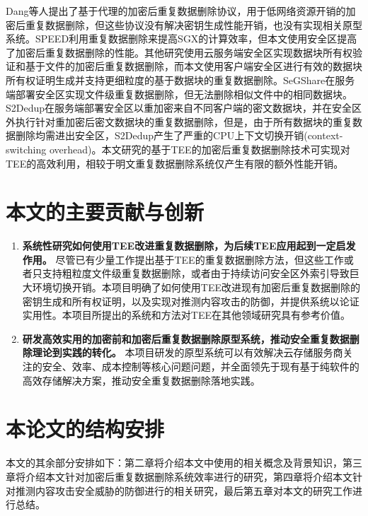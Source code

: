 Dang等人\cite{dang2017Privacy}提出了基于代理的加密后重复数据删除协议，用于低网络资源开销的加密后重复数据删除，但这些协议没有解决密钥生成性能开销，也没有实现相关原型系统。SPEED\cite{cui2019SPEED}利用重复数据删除来提高SGX的计算效率，但本文使用安全区提高了加密后重复数据删除的性能。其他研究使用云服务端安全区实现数据块所有权验证\cite{you2020Proofs}和基于文件的加密后重复数据删除\cite{fuhry20}，而本文使用客户端安全区进行有效的数据块所有权证明生成并支持更细粒度的基于数据块的重复数据删除。SeGShare\cite{fuhry2020segshare}在服务端部署安全区实现文件级重复数据删除，但无法删除相似文件中的相同数据块。S2Dedup\cite{miranda2021S2Dedup}在服务端部署安全区以重加密来自不同客户端的密文数据块，并在安全区外执行针对重加密后密文数据块的重复数据删除，但是，由于所有数据块的重复数据删除均需进出安全区，S2Dedup产生了严重的CPU上下文切换开销(context-switching overhead)\cite{weisse2017regaining}。本文研究的基于TEE的加密后重复数据删除技术可实现对TEE的高效利用，相较于明文重复数据删除系统仅产生有限的额外性能开销。

\section{本文的主要贡献与创新}

\begin{enumerate}[leftmargin=*]
    \item \textbf{系统性研究如何使用TEE改进重复数据删除，为后续TEE应用起到一定启发作用。}
    尽管已有少量工作提出基于TEE的重复数据删除方法，但这些工作或者只支持粗粒度文件级重复数据删除\cite{fuhry2020segshare}，或者由于持续访问安全区外索引导致巨大环境切换开销\cite{miranda2021S2Dedup}。本项目明确了如何使用TEE改进现有加密后重复数据删除的密钥生成和所有权证明，以及实现对推测内容攻击的防御，并提供系统以论证实用性。本项目所提出的系统和方法对TEE在其他领域研究具有参考价值。
    \item \textbf{研发高效实用的加密前和加密后重复数据删除原型系统，推动安全重复数据删除理论到实践的转化。}
    本项目研发的原型系统可以有效解决云存储服务商关注的安全、效率、成本控制等核心问题问题，并全面领先于现有基于纯软件的高效存储解决方案，推动安全重复数据删除落地实践。
\end{enumerate}

\section{本论文的结构安排}

本文的其余部分安排如下：第二章将介绍本文中使用的相关概念及背景知识，第三章将介绍本文针对加密后重复数据删除系统效率进行的研究，第四章将介绍本文针对推测内容攻击安全威胁的防御进行的相关研究，最后第五章对本文的研究工作进行总结。
